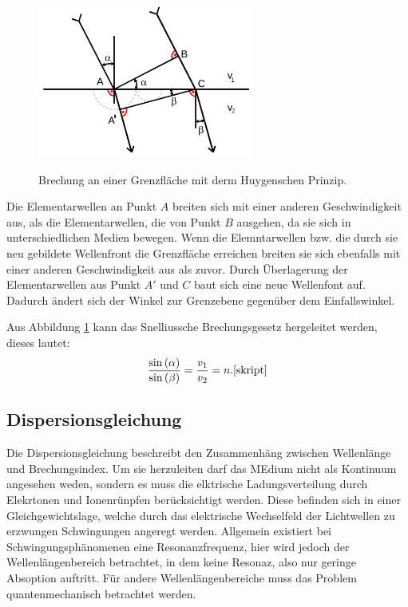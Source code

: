 \begin{figure}[H]
  \centering
  \includegraphics[height=5cm]{huygen.png}
  \caption{Brechung an einer Grenzfläche mit derm Huygenschen Prinzip.}
  \label{fig:huyg}
  \cite{skript}
\end{figure}

Die Elementarwellen an Punkt $A$ breiten sich mit einer anderen Geschwindigkeit
aus, als die Elementarwellen, die von Punkt $B$ ausgehen, da sie sich in
unterschiedlichen Medien bewegen. Wenn die Elemntarwellen bzw. die
durch sie neu gebildete Wellenfront die Grenzfläche erreichen breiten sie sich
ebenfalls mit einer anderen Geschwindigkeit aus als zuvor. Durch Überlagerung
der Elementarwellen aus Punkt $A'$ und $C$ baut sich eine neue Wellenfont auf.
Dadurch ändert sich der Winkel zur Grenzebene gegenüber dem Einfallswinkel.

Aus Abbildung \ref{fig:huyg} kann das Snelliussche Brechungsgesetz hergeleitet werden,
dieses lautet:
\begin{equation}
  \frac{\sin{(\alpha)}}{\sin{(\beta)}}=\frac{v_1}{v_2}=n.
  \label{brechung}
  \cite{skript}
\end{equation}

\subsection{Dispersionsgleichung}
Die Dispersionsgleichung beschreibt den Zusammenhäng zwischen Wellenlänge
und Brechungsindex. Um sie herzuleiten darf das MEdium nicht als Kontinuum
angesehen weden, sondern es muss die elktrische Ladungsverteilung durch
Elekrtonen und Ionenrünpfen
berücksichtigt werden. Diese befinden sich in einer Gleichgewichtslage, welche
durch das elektrische Wechselfeld der Lichtwellen zu erzwungen Schwingungen
angeregt werden. Allgemein existiert bei Schwingungsphänomenen eine Resonanzfrequenz,
hier wird jedoch der Wellenlängenbereich betrachtet, in dem keine
Resonaz, also nur geringe Absoption auftritt. Für andere Wellenlängenbereiche
muss das Problem quantenmechanisch betrachtet werden.

